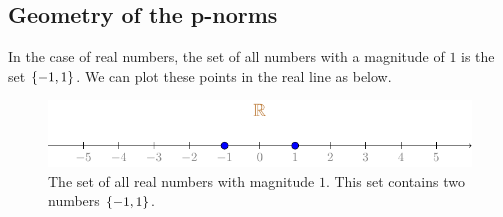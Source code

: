 \subsection{Geometry of the p-norms}
In the case of real numbers, the set of all numbers with a magnitude of $1$ is the set $\left\{ -1, 1 \right\}$. We can plot these points in the real line as below.

\begin{figure}[h]
    \centering
    \includegraphics{figure/chapter01/mag-locus.pdf}
    \caption{The set of all real numbers with magnitude $1$. This set contains two numbers $\left\{ -1, 1 \right\}$.}
    \label{fig:real-line-1-norm}
\end{figure}

